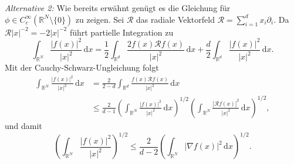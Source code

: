 \documentclass[11pt,twoside,a4paper]{article}
\theoremstyle{break}
\begin{document}
\emph{Alternative 2:} Wie bereits erwähnt genügt es die Gleichung für $\phi \in C_c^\infty(\mathbb R^N\setminus\{0\})$ zu zeigen.  Sei $\mathcal R$ das radiale Vektorfeld $\mathcal R=\sum_{i=1}^d x_i \partial_{i}$. Da $\mathcal R|x|^{-2}=-2|x|^{-2}$ führt partielle Integration zu
\begin{equation}
\int_{\mathbb R^N} \frac{|f(x)|^2}{|x|^2}\, \mathrm dx = \frac{1}{2} \int_{\mathbb R^d} \frac{2f(x) \mathcal Rf(x)}{|x|^2} \, \mathrm dx + \frac{d}{2} \int_{\mathbb R^d} \frac{|f(x)|^2}{|x|^2} \, \mathrm dx.
\end{equation}
Mit der Cauchy-Schwarz-Ungleichung folgt
\begin{align*}
\int_{\mathbb R^N} \frac{|f(x)|^2}{|x|^2} \, \mathrm dx &=  \frac{2}{2-d} \int_{\mathbb R^d} \frac{f(x) \mathcal Rf(x)}{|x|^2}\, \mathrm dx\\
&\le \frac{2}{d-1}\left ( \int_{\mathbb R^N} \frac{|f(x)|^2}{|x|^2}\, \mathrm dx \right )^{1/2} \left ( \int_{\mathbb R^N} \frac{|\mathcal R f(x)|^2}{|x|^2} \, \mathrm dx \right )^{1/2},
\end{align*}
und damit
\begin{equation}
\left (\int_{\mathbb R^N} \frac{|f(x)|^2}{|x|^2} \right )^{1/2}\le \frac{2}{d-2} \left ( \int_{\mathbb R^N} |\nabla f(x)|^2\, \mathrm dx \right )^{1/2}.
\end{equation}
\end{document}
